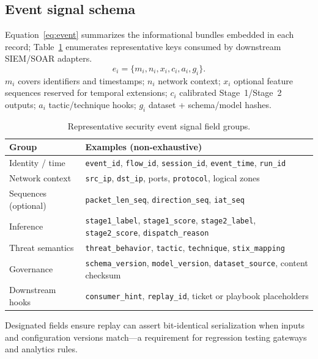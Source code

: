 \subsection{Event signal schema}

Equation~\eqref{eq:event} summarizes the informational bundles embedded in each record; Table~\ref{tab:event_schema} enumerates representative keys consumed by downstream SIEM/SOAR adapters.
\begin{equation}
  e_i = \{m_i, n_i, x_i, c_i, a_i, g_i\}.
  \label{eq:event}
\end{equation}
$m_i$ covers identifiers and timestamps; $n_i$ network context; $x_i$ optional feature sequences reserved for temporal extensions; $c_i$ calibrated Stage~1/Stage~2 outputs; $a_i$ tactic/technique hooks; $g_i$ dataset + schema/model hashes.

\begin{table}[t]
  \centering
  \caption{Representative security event signal field groups.}
  \label{tab:event_schema}
  \footnotesize
  \setlength{\tabcolsep}{3pt}
  \begin{tabularx}{\textwidth}{@{}l >{\raggedright\arraybackslash}X@{}}
    \toprule
    Group & Examples (non-exhaustive) \\
    \midrule
    Identity / time & \texttt{event\_id}, \texttt{flow\_id}, \texttt{session\_id}, \texttt{event\_time}, \texttt{run\_id} \\
    Network context & \texttt{src\_ip}, \texttt{dst\_ip}, ports, \texttt{protocol}, logical zones \\
    Sequences (optional) & \texttt{packet\_len\_seq}, \texttt{direction\_seq}, \texttt{iat\_seq} \\
    Inference & \texttt{stage1\_label}, \texttt{stage1\_score}, \texttt{stage2\_label}, \texttt{stage2\_score}, \texttt{dispatch\_reason} \\
    Threat semantics & \texttt{threat\_behavior}, \texttt{tactic}, \texttt{technique}, \texttt{stix\_mapping} \\
    Governance & \texttt{schema\_version}, \texttt{model\_version}, \texttt{dataset\_source}, content checksum \\
    Downstream hooks & \texttt{consumer\_hint}, \texttt{replay\_id}, ticket or playbook placeholders \\
    \bottomrule
  \end{tabularx}
\end{table}

Designated fields ensure replay can assert bit-identical serialization when inputs and configuration versions match---a requirement for regression testing gateways and analytics rules.
